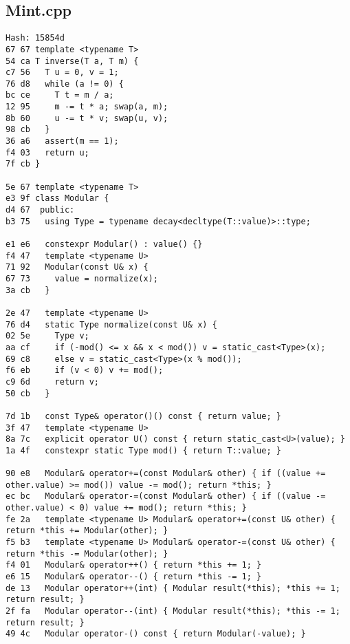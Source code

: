 \documentclass[11pt, a4paper, twoside]{article}
\begin{document}
\subsection{Mint.cpp}
\begin{lstlisting}
Hash: 15854d
67 67 template <typename T>
54 ca T inverse(T a, T m) {
c7 56   T u = 0, v = 1;
76 d8   while (a != 0) {
bc ce     T t = m / a;
12 95     m -= t * a; swap(a, m);
8b 60     u -= t * v; swap(u, v);
98 cb   }
36 a6   assert(m == 1);
f4 03   return u;
7f cb }

5e 67 template <typename T>
e3 9f class Modular {
d4 67  public:
b3 75   using Type = typename decay<decltype(T::value)>::type;
      
e1 e6   constexpr Modular() : value() {}
f4 47   template <typename U>
71 92   Modular(const U& x) {
67 73     value = normalize(x);
3a cb   }
      
2e 47   template <typename U>
76 d4   static Type normalize(const U& x) {
02 5e     Type v;
aa cf     if (-mod() <= x && x < mod()) v = static_cast<Type>(x);
69 c8     else v = static_cast<Type>(x % mod());
f6 eb     if (v < 0) v += mod();
c9 6d     return v;
50 cb   }
      
7d 1b   const Type& operator()() const { return value; }
3f 47   template <typename U>
8a 7c   explicit operator U() const { return static_cast<U>(value); }
1a 4f   constexpr static Type mod() { return T::value; }
      
90 e8   Modular& operator+=(const Modular& other) { if ((value += other.value) >= mod()) value -= mod(); return *this; }
ec bc   Modular& operator-=(const Modular& other) { if ((value -= other.value) < 0) value += mod(); return *this; }
fe 2a   template <typename U> Modular& operator+=(const U& other) { return *this += Modular(other); }
f5 b3   template <typename U> Modular& operator-=(const U& other) { return *this -= Modular(other); }
f4 01   Modular& operator++() { return *this += 1; }
e6 15   Modular& operator--() { return *this -= 1; }
de 13   Modular operator++(int) { Modular result(*this); *this += 1; return result; }
2f fa   Modular operator--(int) { Modular result(*this); *this -= 1; return result; }
49 4c   Modular operator-() const { return Modular(-value); }
      

\end{lstlisting}
\end{document}

